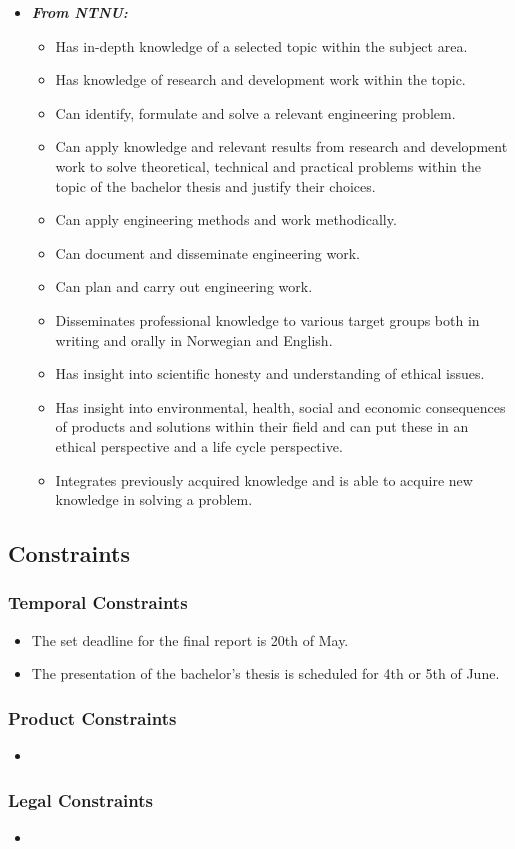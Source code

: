 \begin{itemize}
    \item 
    \textit{\textbf{From NTNU:}}
    \begin{itemize}
        \item Has in-depth knowledge of a selected topic within the subject area.
        \item Has knowledge of research and development work within the topic.
        \item Can identify, formulate and solve a relevant engineering problem.
        \item Can apply knowledge and relevant results from research and development work to solve theoretical, technical and practical problems within the topic of the bachelor thesis and justify their choices.
        \item Can apply engineering methods and work methodically.
        \item Can document and disseminate engineering work.
        \item Can plan and carry out engineering work.
        \item Disseminates professional knowledge to various target groups both in writing and orally in Norwegian and English.
        \item Has insight into scientific honesty and understanding of ethical issues.
        \item Has insight into environmental, health, social and economic consequences of products and solutions within their field and can put these in an ethical perspective and a life cycle perspective.
        \item Integrates previously acquired knowledge and is able to acquire new knowledge in solving a problem.
    \end{itemize}
\end{itemize}

\subsection{Constraints}
\subsubsection{Temporal Constraints}
\begin{itemize}
    \item The set deadline for the final report is 20th of May.
    \item The presentation of the bachelor's thesis is scheduled for 4th or 5th of June.
\end{itemize}

\subsubsection{Product Constraints}
\begin{itemize}
    \item 
\end{itemize}

\subsubsection{Legal Constraints}
\begin{itemize}
    \item 
\end{itemize}